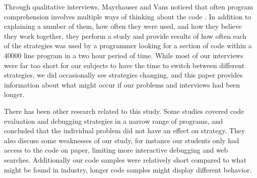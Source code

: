 Through qualitative interviews, Mayrhauser and Vans noticed that often program comprehension involves multiple ways of thinking about the code \cite{402076}.
In addition to explaining a number of them, how often they were used, and how they believe they work together, they perform a study and provide results of how often each of the strategies was used by a programmer looking for a section of code within a 40000 line program in a two hour period of time.
While most of our interviews were far too short for our subjects to have the time to switch between different strategies, we did occasionally see strategies changing, and this paper provides information about what might occur if our problems and interviews had been longer. 

There has been other research related to this study.
Some studies covered code evaluation and debugging strategies in a narrow range of programs,
 and concluded that the individual problem did not have an effect on strategy.
They also discuss some weaknesses of our study, for instance our students only had access to the code on paper, limiting more interactive debugging and web searches.
Additionally our code samples were relatively short compared to what might be found in industry,
 longer code samples might display different behavior.
